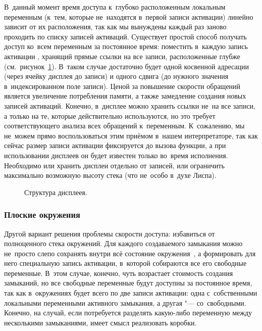 В~данный момент время доступа к~глубоко расположенным локальным переменным
(к~тем, которые не~находятся в~первой записи активации) линейно зависит от
их расположения, так как мы вынуждены каждый раз заново проходить по списку
записей активаций. Существует простой способ получать доступ ко~всем переменным
за постоянное время: поместить в~каждую запись активации ,
хранящий прямые ссылки на все записи, расположенные глубже
(см.~рисунок~\ref{fast/fast/variations/pic:display}). В~таком случае достаточно
будет одной косвенной адресации (через ячейку дисплея до записи) и одного сдвига
(до нужного значения в~индексированном поле записи). Ценой за повышение скорости
обращений является увеличение потребления памяти, а также замедление создания
новых записей активаций. Конечно, в~дисплее можно хранить ссылки не~на все
записи, а только на те, которые действительно используются, но это требует
соответствующего анализа всех обращений к~переменным. К~сожалению, мы не~можем
прямо воспользоваться этим приёмом в~нашем интерпретаторе, так как сейчас размер
записи активации фиксируется до вызова функции, а при использовании дисплеев он
будет известен только во~время исполнения. Необходимо или хранить дисплеи
отдельно от записей, или ограничить максимально возможную высоту стека (что
не~особо в~духе Лиспа).

\begin{figure}[!h]
\begin{center}

\end{center}
\caption{Структура дисплеев.}\label{fast/fast/variations/pic:display}
\end{figure}


\subsubsection{Плоские окружения}\label{fast/fast/variations/ssect:flat}

Другой вариант решения проблемы скорости доступа: избавиться от полноценного
стека окружений. Для каждого создаваемого замыкания можно не~просто слепо
сохранять внутри всё состояние окружения~, а формировать для него
специальную запись активации, в~которой собираются все его свободные переменные.
В~этом случае, конечно, чуть возрастает стоимость создания замыканий, но все
свободные переменные будут доступны за постоянное время, так как в~окружениях
будет всего по две записи активации: одна с~собственными локальными переменными
активного замыкания, а другая "--- со~свободными. Конечно, на случай, если
потребуется разделять какую-либо переменную между несколькими замыканиями, имеет
смысл реализовать коробки. 

